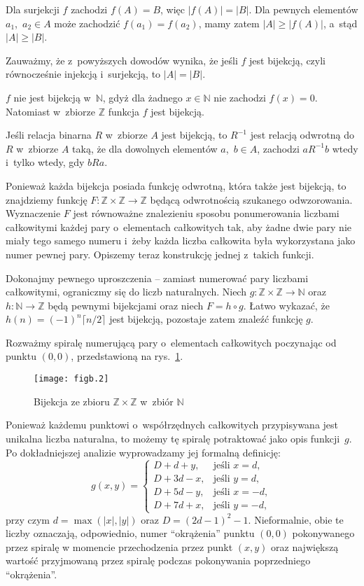 \subexercise
Dla surjekcji $f$ zachodzi $f(A)=B$, więc $|f(A)|=|B|$. Dla pewnych elementów $a_1$,~$a_2\in A$ może zachodzić $f(a_1)=f(a_2)$, mamy zatem $|A|\ge|f(A)|$, a~stąd $|A|\ge|B|$.
\bigskip

Zauważmy, że z~powyższych dowodów wynika, że jeśli $f$ jest bijekcją, czyli równocześnie injekcją i~surjekcją, to $|A|=|B|$.

\exercise %
$f$ nie jest bijekcją w~$\mathbb{N}$, gdyż dla żadnego $x\in\mathbb{N}$ nie zachodzi $f(x)=0$. Natomiast w~zbiorze $\mathbb{Z}$ funkcja $f$ jest bijekcją.

\exercise %
Jeśli relacja binarna $R$ w~zbiorze $A$ jest bijekcją, to $R^{-1}$ jest relacją odwrotną do $R$ w~zbiorze $A$ taką, że dla dowolnych elementów $a$,~$b\in A$, zachodzi $aR^{-1}b$ wtedy i~tylko wtedy, gdy $bRa$.

\exercise %
Ponieważ każda bijekcja posiada funkcję odwrotną, która także jest bijekcją, to znajdziemy funkcję $F\colon\mathbb{Z}\times\mathbb{Z}\to\mathbb{Z}$ będącą odwrotnością szukanego odwzorowania. Wyznaczenie $F$ jest równoważne znalezieniu sposobu ponumerowania liczbami całkowitymi każdej pary o~elementach całkowitych tak, aby żadne dwie pary nie miały tego samego numeru i~żeby każda liczba całkowita była wykorzystana jako numer pewnej pary. Opiszemy teraz konstrukcję jednej z~takich funkcji.

Dokonajmy pewnego uproszczenia -- zamiast numerować pary liczbami całkowitymi, ograniczmy się do liczb naturalnych. Niech $g\colon\mathbb{Z}\times\mathbb{Z}\to\mathbb{N}$ oraz $h\colon\mathbb{N}\to\mathbb{Z}$ będą pewnymi bijekcjami oraz niech $F=h\circ g$. Łatwo wykazać, że $h(n)=(-1)^n\lceil n/2\rceil$ jest bijekcją, pozostaje zatem znaleźć funkcję $g$.

Rozważmy spiralę numerującą pary o~elementach całkowitych poczynając od punktu $(0,0)$, przedstawioną na rys.~\ref{fig:B.3-4}.
\begin{figure}[ht]
	\begin{center}
		\texttt{[image: figb.2]}
	\end{center}
	\caption{Bijekcja ze zbioru $\mathbb{Z}\times\mathbb{Z}$ w~zbiór $\mathbb{N}$} \label{fig:B.3-4}
\end{figure}
Ponieważ każdemu punktowi o~współrzędnych całkowitych przypisywana jest unikalna liczba naturalna, to możemy tę spiralę potraktować jako opis funkcji~$g$. Po dokładniejszej analizie wyprowadzamy jej formalną definicję:
\[
    g(x,y) =
	\begin{cases}
		D+d+y, & \text{jeśli $x=d$}, \\
		D+3d-x, & \text{jeśli $y=d$}, \\
		D+5d-y, & \text{jeśli $x=-d$}, \\
		D+7d+x, & \text{jeśli $y=-d$},
	\end{cases}
\]
przy czym $d=\max(|x|,|y|)$ oraz $D=(2d-1)^2-1$. Nieformalnie, obie te liczby oznaczają, odpowiednio, numer ``okrążenia'' punktu $(0,0)$ pokonywanego przez spiralę w momencie przechodzenia przez punkt $(x,y)$ oraz największą wartość przyjmowaną przez spiralę podczas pokonywania poprzedniego ``okrążenia''.

